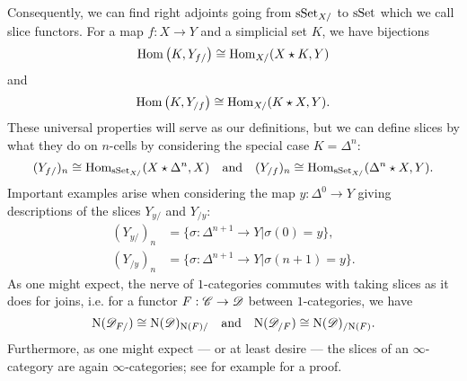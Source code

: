 \documentclass[../../thesis.tex]{subfiles}
\begin{document}
Consequently, we can find right adjoints going from $\mathrm{sSet}_{X/}$ to $\mathrm{sSet}$ which we call slice functors.
For a map $f\colon X\to Y$ and a simplicial set $K$, we have bijections
\[
    \mathrm{Hom}\left(K, Y_{f /}\right) \cong \mathrm{Hom}_{X /}(X \star K, Y)
\]
and
\[
    \mathrm{Hom}\left(K, Y_{/ f}\right) \cong \mathrm{Hom}_{X /}(K \star X, Y).
\]
These universal properties will serve as our definitions, but we can define slices by what they do on $n$-cells by considering the special case $K=\Delta^n$:
\[
    (Y_{f/})_n \cong \mathrm{Hom}_{\mathrm{sSet}_{X/}}(X\star \Delta^n, X) \quad \text{and} \quad    (Y_{/f})_n \cong \mathrm{Hom}_{\mathrm{sSet}_{X/}}(\Delta^n\star X, Y).
\]
Important examples arise when considering the map $y\colon \Delta^0\to Y$ giving descriptions of the slices $Y_{y/}$ and $Y_{/y}$:
\begin{align*}
    (Y_{y/})_n & = \{ \sigma \colon \Delta^{n+1} \to Y | \sigma(0) = y\},   \\
    (Y_{/y})_n & = \{ \sigma \colon \Delta^{n+1} \to Y | \sigma(n+1) = y\}.
\end{align*}
As one might expect, the nerve of $1$-categories commutes with taking slices as it does for joins, i.e. for a functor $F: \mathscr{C} \to \mathscr{D}$ between $1$-categories, we have
\[
    \mathrm{N}(\mathscr{D}_{F/}) \cong \mathrm{N}(\mathscr{D})_{\mathrm{N}(F)/}\quad \text{and} \quad \mathrm{N}(\mathscr{D}_{/F}) \cong \mathrm{N}(\mathscr{D})_{/\mathrm{N}(F)}.
\]
Furthermore, as one might expect --- or at least desire --- the slices of an $\infty$-category are again $\infty$-categories; see for example \cite[Proposition 30.2.]{Rezk} for a proof.
\end{document}

